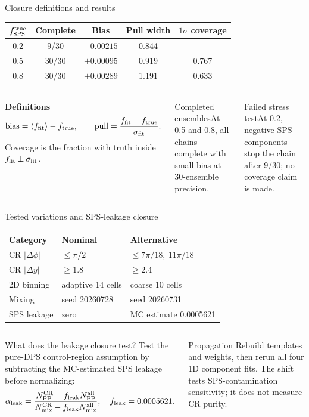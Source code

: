 \documentclass[11pt,aspectratio=169]{beamer}
\begin{document}
\begin{frame}{Closure definitions and results}
\small\begin{center}\begin{tabular}{ccccc}\toprule $f_{\rm SPS}^{\rm true}$&Complete&Bias&Pull width&$1\sigma$ coverage\\\midrule 0.2&9/30&$-0.00215$&0.844&---\\0.5&30/30&$+0.00095$&0.919&0.767\\0.8&30/30&$+0.00289$&1.191&0.633\\\bottomrule\end{tabular}\end{center}
\begin{columns}[T]\textbf{Definitions}\[\mathrm{bias}=\langle f_{\rm fit}\rangle-f_{\rm true},\qquad \mathrm{pull}=\frac{f_{\rm fit}-f_{\rm true}}{\sigma_{\rm fit}}.\]Coverage is the fraction with truth inside $f_{\rm fit}\pm\sigma_{\rm fit}$.
\begin{exampleblock}{Completed ensembles}At 0.5 and 0.8, all chains complete with small bias at 30-ensemble precision.\end{exampleblock}\begin{alertblock}{Failed stress test}At 0.2, negative SPS components stop the chain after 9/30; no coverage claim is made.\end{alertblock}\end{columns}
\end{frame}

\begin{frame}{Tested variations and SPS-leakage closure}
\small\begin{center}\begin{tabular}{lll}\toprule Category&Nominal&Alternative\\\midrule CR $|\Delta\phi|$&$\leq\pi/2$&$\leq7\pi/18,\ 11\pi/18$\\CR $|\Delta y|$&$\geq1.8$&$\geq2.4$\\2D binning&adaptive 14 cells&coarse 10 cells\\Mixing&seed 20260728&seed 20260731\\SPS leakage&zero&MC estimate 0.0005621\\\bottomrule\end{tabular}\end{center}
\begin{columns}[T]
\begin{block}{What does the leakage closure test?}
Test the pure-DPS control-region assumption by subtracting the MC-estimated SPS leakage before normalizing:
\[\alpha_{\rm leak}=\frac{N_{\rm PP}^{\rm CR}-f_{\rm leak}N_{\rm PP}^{\rm all}}{N_{\rm mix}^{\rm CR}-f_{\rm leak}N_{\rm mix}^{\rm all}},\quad f_{\rm leak}=0.0005621.\]
\end{block}
\begin{block}{Propagation}
Rebuild templates and weights, then rerun all four 1D component fits. The shift tests SPS-contamination sensitivity; it does not measure CR purity.
\end{block}
\end{columns}
\end{frame}
\end{document}
